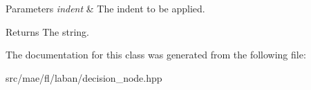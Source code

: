 \begin{DoxyParams}{Parameters}
{\em indent} & The indent to be applied. \\
\hline
\end{DoxyParams}
\begin{DoxyReturn}{Returns}
The string. 
\end{DoxyReturn}


The documentation for this class was generated from the following file\-:\begin{DoxyCompactItemize}
\item 
src/mae/fl/laban/decision\-\_\-node.\-hpp\end{DoxyCompactItemize}
